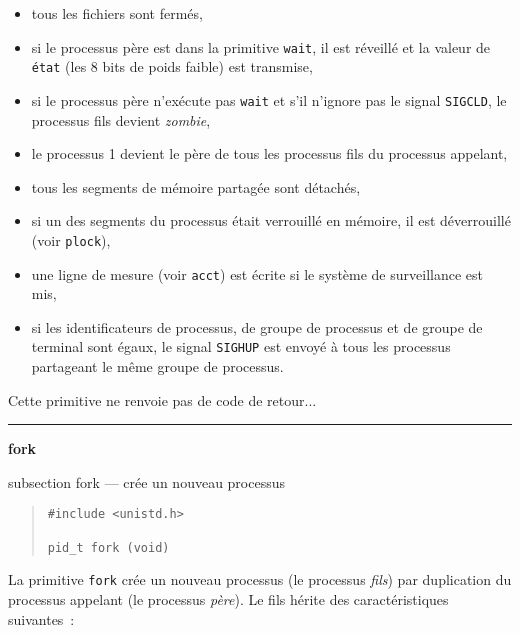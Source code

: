 \documentclass [twoside] {report}
\newcommand {\primitive} [1]
    {
	\phantomsection
	{\large \bf #1}
	\addcontentsline {toc} {subsection} {#1}
    }
\newcommand {\separation}
    {
	\vspace {5mm}
	\nopagebreak
	\hrule
    }
\begin{document}
\begin {itemize}
\item tous les fichiers sont fermés,
\item si le processus père est dans la primitive
{\tt wait}, il est réveillé et la valeur de {\tt état}
(les 8 bits de poids faible) est transmise,
\item si le processus père n'exécute pas {\tt wait} et
s'il n'ignore pas le signal {\tt SIGCLD}, le
processus fils devient {\it zombie},
\item le processus 1 devient le père de tous les
processus fils du processus appelant,
\item tous les segments de mémoire partagée sont
détachés,
\item si un des segments du processus était
verrouillé en mémoire, il est déverrouillé (voir
{\tt plock}),
\item une ligne de mesure (voir {\tt acct}) est écrite
si le système de surveillance est mis,
\item si les identificateurs de processus, de groupe
de processus et de groupe de terminal sont égaux,
le signal {\tt SIGHUP} est envoyé à tous les
processus partageant le même groupe de
processus.
\end {itemize}

Cette primitive ne renvoie pas de code de
retour...




\separation
\primitive {fork} --- crée un nouveau processus

\begin {quote}
\begin {verbatim}
#include <unistd.h>

pid_t fork (void)
\end{verbatim}
\end {quote}

La primitive {\tt fork} crée un nouveau processus
(le processus {\it fils})
par duplication du processus appelant (le
processus {\it père}). Le fils hérite des
caractéristiques suivantes~:
\end{document}

